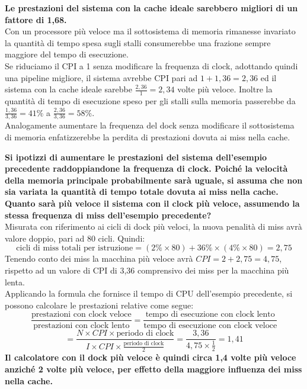 \documentclass[a4paper,12pt, oneside]{book}
\begin{document}
\begin{esercizio}
  \textbf{Le prestazioni del sistema con la cache ideale sarebbero
    migliori di un fattore di 1,68.}\\
  Con un processore più veloce ma il sottosistema di
  memoria rimanesse invariato la quantità di tempo spesa sugli stalli
  consumerebbe una frazione sempre maggiore del tempo di esecuzione.\\
  Se riduciamo il CPI a 1 senza modificare la frequenza di clock,
  adottando quindi una pipeline migliore, il sistema avrebbe CPI
  pari ad $1+1,36 = 2,36$ ed il sistema con la cache ideale sarebbe
  $\frac{2,36}{1}=2,34$ volte più veloce. Inoltre la quantità di tempo
  di esecuzione speso per gli stalli sulla memoria passerebbe da
  $\frac{1,36}{3,36}=41\%$ a $\frac{2,36}{3,36}=58\%$. \\
  Analogamente aumentare la frequenza del dock senza modificare il
  sottosistema di memoria enfatizzerebbe la perdita di prestazioni
  dovuta ai miss nella cache.
\end{esercizio}
\begin{esercizio}
  \textbf{Si ipotizzi di aumentare le prestazioni del sistema
    dell'esempio precedente raddoppiandone la frequenza di clock.
    Poiché la velocità della memoria principale probabilmente sarà
    uguale, si assuma che non sia variata la quantità di tempo totale
    dovuta ai miss nella cache. Quanto sarà più veloce il sistema con
    il clock più veloce, assumendo la stessa frequenza di miss
    dell'esempio precedente?}\\
  Misurata con riferimento ai cicli di dock più veloci,
  la nuova penalità di miss avrà valore doppio, pari ad 80
  cicli. Quindi:
  \[\mbox{cicli di miss totali per istruzione} = (2\%\times
    80)+36\%\times (4\% \times 80) = 2,75\]
  Tenendo conto dei miss la macchina più veloce avrà $CPI = 2+2,75 =
  4,75$, rispetto ad un valore di CPI di 3,36 comprensivo dei miss
  per la macchina più lenta.\\
  Applicando la formula che fornisce il tempo di CPU dell'esempio
  precedente, si possono calcolare le prestazioni relative come segue:
  \[\frac{\mbox{prestazioni con clock veloce}}{\mbox{prestazioni con
        clock lento}}=\frac{\mbox{tempo di esecuzione con clock
        lento}}{\mbox{tempo di esecuzione con clock veloce}}\]
  \[=\frac{N\times CPI\times \mbox{periodo di clock}}{I\times
      CPI\times \frac{\mbox{periodo di
          clock}}{2}}=\frac{3,36}{4,75\times \frac{1}{2}}=1,41\]
  \textbf{Il calcolatore con il dock più veloce è quindi circa 1,4
    volte più veloce anziché 2 volte più veloce, per effetto della
    maggiore influenza dei miss nella cache.}
\end{esercizio}
\end{document}
